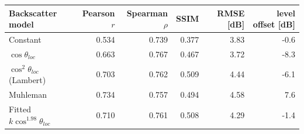\begin{tabular}{lrrrrr}\toprule
 Backscatter model & Pearson $r$ & Spearman $\rho$ & SSIM & RMSE [dB] & level offset [dB]\\\midrule
Constant & 0.534 & 0.739 & 0.377 & 3.83 & -0.6 \\
$\cos\theta_{loc}$ & 0.663 & 0.767 & 0.467 & 3.72 & -8.3 \\
$\cos^2\theta_{loc}$ (Lambert) & 0.703 & 0.762 & 0.509 & 4.44 & -6.1 \\
Muhleman & 0.734 & 0.757 & 0.494 & 4.58 & 7.6 \\
Fitted $k\cos^{1.98}\theta_{loc}$ & 0.710 & 0.761 & 0.508 & 4.29 & -1.4 \\
\bottomrule\end{tabular}
